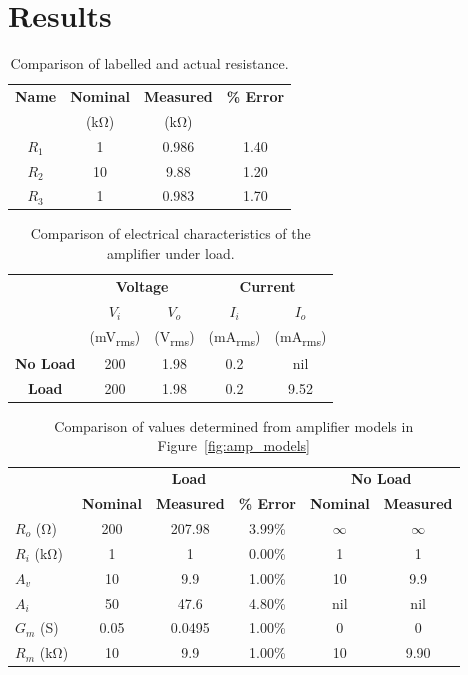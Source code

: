\documentclass{article}
\begin{document}
\section{Results}
\label{sec:results}

\begin{table}[hbtp]
  \centering
  \begin{tabular}{*{4}{c}}
    \textbf{Name} & \textbf{Nominal} & \textbf{Measured} & \textbf{\% Error} \\
    & (\si{\kilo\ohm}) & (\si{\kilo\ohm}) & \\
    \hline
    $R_1$ & 1 & 0.986 & 1.40 \\
    $R_2$ & 10 & 9.88 & 1.20 \\
    $R_3$ & 1 & 0.983 & 1.70 \\
  \end{tabular}
  \caption{Comparison of labelled and actual resistance.}
  \label{tab:table_01}
  \end{table}

\begin{table}[hbtp]
  \centering
  \begin{tabular}{*{5}{c}}
    & \multicolumn{2}{c}{\textbf{Voltage}} & \multicolumn{2}{c}{\textbf{Current}} \\
    & $V_i$ & $V_o$ & $I_i$ & $I_o$ \\
    & (\si{\milli\volt_{rms}}) & (\si{\volt_{rms}}) & (\si{\milli\ampere_{rms}}) & (\si{\milli\ampere_{rms}}) \\
    \hline
    \textbf{No Load} & 200 & 1.98 & 0.2 & nil \\
    \textbf{Load} & 200 & 1.98 & 0.2 & 9.52 \\
  \end{tabular}
  \caption{Comparison of electrical characteristics of the amplifier under load.}
  \label{tab:table_02}
\end{table}

\begin{table}[hbtp]
  \centering
  \begin{tabular}{l*{5}{c}}
    & \multicolumn{3}{c}{\textbf{Load}} & \multicolumn{2}{c}{\textbf{No Load}} \\
    & \textbf{Nominal} & \textbf{Measured} & \textbf{\% Error} & \textbf{Nominal} & \textbf{Measured} \\
    \hline
    $R_o$ (\si{\ohm}) & 200 & 207.98 & 3.99\% & $\infty$ & $\infty$ \\
    $R_i$ (\si{\kilo\ohm}) & 1 & 1 & 0.00\% & 1 & 1 \\
    $A_v$ & 10 & 9.9 & 1.00\% & 10 & 9.9 \\
    $A_i$ & 50 & 47.6 & 4.80\% & nil & nil \\
    $G_m$ (\si{\siemens}) & 0.05 & 0.0495 & 1.00\% & 0 & 0 \\
    $R_m$ (\si{\kilo\ohm}) & 10 & 9.9 & 1.00\% & 10 & 9.90 \\
  \end{tabular}
  \caption{Comparison of values determined from amplifier models in Figure~\ref{fig:amp_models}}
  \label{tab:table_03}
\end{table}
\end{document}
